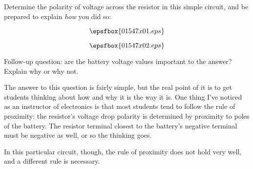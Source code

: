 

Determine the polarity of voltage across the resistor in this simple circuit, and be prepared to explain {\it how} you did so:

$$\epsfbox{01547x01.eps}$$







$$\epsfbox{01547x02.eps}$$

Follow-up question: are the battery voltage values important to the answer?  Explain why or why not.







The answer to this question is fairly simple, but the real point of it is to get students thinking about how and why it is the way it is.  One thing I've noticed as an instructor of electronics is that most students tend to follow the rule of proximity: the resistor's voltage drop polarity is determined by proximity to poles of the battery.  The resistor terminal closest to the battery's negative terminal must be negative as well, or so the thinking goes.  

In this particular circuit, though, the rule of proximity does not hold very well, and a different rule is necessary.




